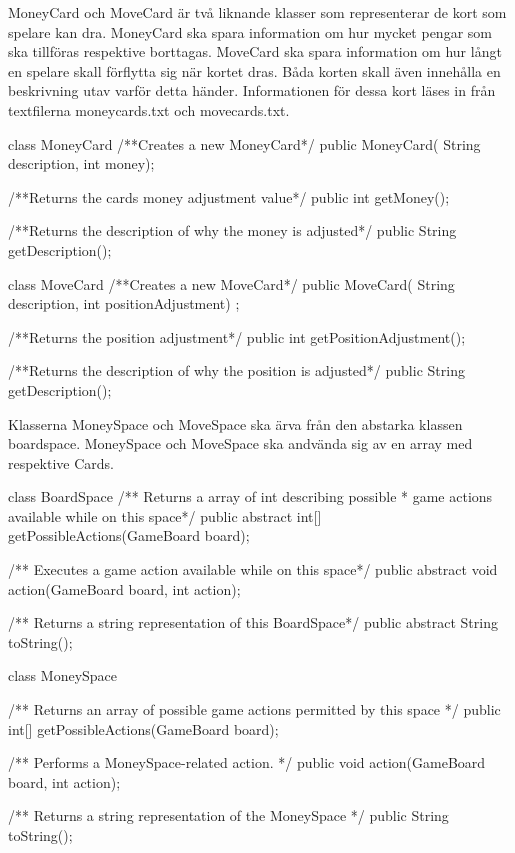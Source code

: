 MoneyCard och MoveCard är två liknande klasser som representerar de kort som spelare kan dra. MoneyCard ska spara information om hur mycket pengar som ska tillföras respektive borttagas. MoveCard ska spara information om hur långt en spelare skall förflytta sig när kortet dras. Båda korten skall även innehålla en beskrivning utav varför detta händer. Informationen för dessa kort läses in från textfilerna moneycards.txt och movecards.txt.

\begin{JavaSpec}{class MoneyCard}
    /**Creates a new MoneyCard*/
    public MoneyCard( String description, int money);

    /**Returns the cards money adjustment value*/
    public int getMoney();

    /**Returns the description of why the money is adjusted*/ 
    public String getDescription();
\end{JavaSpec}

\begin{JavaSpec}{class MoveCard}
    /**Creates a new MoveCard*/
    public MoveCard( String description, int positionAdjustment) ;

    /**Returns the position adjustment*/
    public int getPositionAdjustment();

    /**Returns the description of why the position is adjusted*/
    public String getDescription();

\end{JavaSpec}

Klasserna MoneySpace och MoveSpace ska ärva från den abstarka klassen boardspace. MoneySpace och MoveSpace ska andvända sig av en array med respektive Cards.

\begin{JavaSpec}{class BoardSpace}
    /** Returns a array of int describing possible
      * game actions available while on this space*/
    public abstract int[] getPossibleActions(GameBoard board);

    /** Executes a game action available while on this space*/
    public abstract void action(GameBoard board, int action);

    /** Returns a string representation of this BoardSpace*/
    public abstract String toString();
\end{JavaSpec}

\begin{JavaSpec}{class MoneySpace}
 
    /** Returns an array of possible game actions permitted by this space */
    public int[] getPossibleActions(GameBoard board);

    /** Performs a MoneySpace-related action. */
    public void action(GameBoard board, int action);

    /** Returns a string representation of the MoneySpace */
   public String toString();

\end{JavaSpec}

